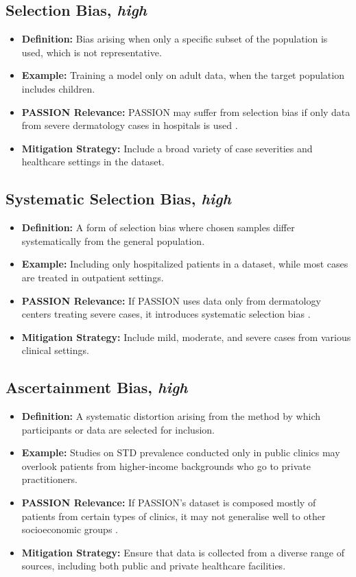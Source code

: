 \begin{refsection}
		\subsection{Selection Bias, \textit{high}}
		\begin{itemize}
			\item \textbf{Definition:} Bias arising when only a specific subset of the population is used, which is not representative.
			\item \textbf{Example:} Training a model only on adult data, when the target population includes children.
			\item \textbf{PASSION Relevance:} PASSION may suffer from selection bias if only data from severe dermatology cases in hospitals is used \autocites{Mester_2022}{Chakraborty_2024}.
			\item \textbf{Mitigation Strategy:} Include a broad variety of case severities and healthcare settings in the dataset.
		\end{itemize}
		
		\subsection{Systematic Selection Bias, \textit{high}}
		\begin{itemize}
			\item \textbf{Definition:} A form of selection bias where chosen samples differ systematically from the general population.
			\item \textbf{Example:} Including only hospitalized patients in a dataset, while most cases are treated in outpatient settings.
			\item \textbf{PASSION Relevance:} If PASSION uses data only from dermatology centers treating severe cases, it introduces systematic selection bias \autocite{Chakraborty_2024, c5,c6,c33}.
			\item \textbf{Mitigation Strategy:} Include mild, moderate, and severe cases from various clinical settings.
		\end{itemize}
		
		\subsection{Ascertainment Bias, \textit{high}}
		\begin{itemize}
			\item \textbf{Definition:} A systematic distortion arising from the method by which participants or data are selected for inclusion.
			\item \textbf{Example:} Studies on STD prevalence conducted only in public clinics may overlook patients from higher-income backgrounds who go to private practitioners.
			\item \textbf{PASSION Relevance:} If PASSION’s dataset is composed mostly of patients from certain types of clinics, it may not generalise well to other socioeconomic groups \autocite{Chakraborty_2024, c5}.
			\item \textbf{Mitigation Strategy:} Ensure that data is collected from a diverse range of sources, including both public and private healthcare facilities.
		\end{itemize}
		

\end{refsection}
